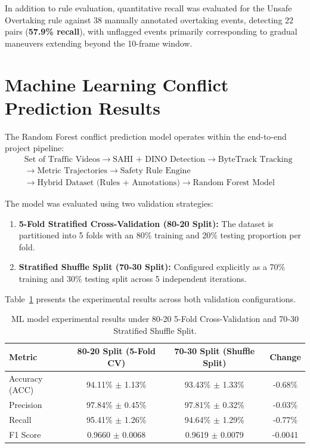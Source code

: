 In addition to rule evaluation, quantitative recall was evaluated for the Unsafe Overtaking rule against 38 manually annotated overtaking events, detecting 22 pairs (\textbf{57.9\% recall}), with unflagged events primarily corresponding to gradual maneuvers extending beyond the 10-frame window.

\section{Machine Learning Conflict Prediction Results}

The Random Forest conflict prediction model operates within the end-to-end project pipeline:
\begin{align*}
&\text{Set of Traffic Videos} \rightarrow \text{SAHI + DINO Detection} \rightarrow \text{ByteTrack Tracking} \\
&\rightarrow \text{Metric Trajectories} \rightarrow \text{Safety Rule Engine} \\
&\rightarrow \text{Hybrid Dataset (Rules + Annotations)} \rightarrow \text{Random Forest Model}
\end{align*}

The model was evaluated using two validation strategies:
\begin{enumerate}
    \item \textbf{5-Fold Stratified Cross-Validation (80-20 Split):} The dataset is partitioned into 5 folds with an 80\% training and 20\% testing proportion per fold.
    \item \textbf{Stratified Shuffle Split (70-30 Split):} Configured explicitly as a 70\% training and 30\% testing split across 5 independent iterations.
\end{enumerate}

Table~\ref{tab:ml_validation_comparison} presents the experimental results across both validation configurations.

\begin{table}[H]
\centering
\caption{ML model experimental results under 80-20 5-Fold Cross-Validation and 70-30 Stratified Shuffle Split.}
\label{tab:ml_validation_comparison}
\begin{tabular}{lccc}
\toprule
\textbf{Metric} & \textbf{80-20 Split (5-Fold CV)} & \textbf{70-30 Split (Shuffle Split)} & \textbf{Change} \\
\midrule
Accuracy (ACC) & 94.11\% $\pm$ 1.13\% & 93.43\% $\pm$ 1.33\% & -0.68\% \\
Precision      & 97.84\% $\pm$ 0.45\% & 97.81\% $\pm$ 0.32\% & -0.03\% \\
Recall         & 95.41\% $\pm$ 1.26\% & 94.64\% $\pm$ 1.29\% & -0.77\% \\
F1 Score       & 0.9660 $\pm$ 0.0068  & 0.9619 $\pm$ 0.0079  & -0.0041 \\
\bottomrule
\end{tabular}
\end{table}

